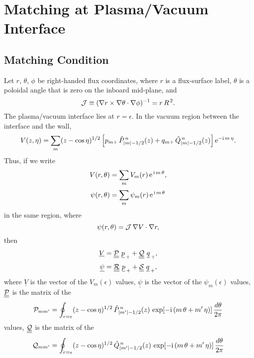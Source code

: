 \documentclass[12pt,prb,aps,notitlepage]{revtex4-1}
\begin{document}
\section{Matching at Plasma/Vacuum Interface}
\subsection{Matching Condition}
Let $r$, $\theta$, $\phi$ be right-handed flux coordinates, where $r$ is a flux-surface label,  $\theta$ is a poloidal angle that is zero on the inboard mid-plane, and
\begin{equation}
{\cal J} \equiv (\nabla r\times\nabla\theta\cdot\nabla\phi)^{-1}= r\,R^{\,2}.
\end{equation}
The plasma/vacuum interface lies at $r=\epsilon$. In the vacuum region between the interface and the wall, 
\begin{equation}
V(z,\eta) =\sum_m (z-\cos\eta)^{1/2}\left[p_{m+}\,\hat{P}_{|m|-1/2}^{\,n}(z)+q_{m+}\,\hat{Q}_{|m|-1/2}^{\,n}(z)\right]{\rm e}^{-{\rm i}\,m\,\eta}. 
\end{equation}
Thus, if we write 
\begin{align}\label{e90}
V(r,\theta) &= \sum_m V_m(r)\,{\rm e}^{\,{\rm i}\,m\,\theta},\\[0.5ex]
\psi(r,\theta) & = \sum_m \psi_m(r)\,{\rm e}^{\,{\rm i}\,m\,\theta}\label{e91}
\end{align}
in the same region,
where
\begin{equation}
\psi(r,\theta)  = {\cal J}\,\nabla V\cdot\nabla r,
\end{equation}
then
\begin{align}
\underline{V}&= \underline{\underline{{\cal P}}}\,\,\underline{p}_{\,+}+ \underline{\underline{{\cal Q}}}\,\,\underline{q}_{\,+},\\[0.5ex]
\underline{\psi}&= \underline{\underline{{\cal R}}}\,\,\underline{p}_{\,+}+ \underline{\underline{{\cal S}}}\,\,\underline{q}_{\,+},
\end{align}
where $\underline{V}$ is the vector of the $V_m(\epsilon)$ values, $\underline{\psi}$ is the vector of the $\psi_m(\epsilon)$ values, $\underline{\underline{{\cal P}}}$ is the
matrix of the
\begin{equation}
{\cal P}_{mm'}=\oint_{r=\epsilon}(z-\cos\eta)^{1/2}\,\hat{P}_{|m'|-1/2}^{\,n}(z)\,\exp[-{\rm i}\,(m\,\theta+m'\,\eta)]\,\frac{d\theta}{2\pi}
\end{equation}
values, 
$\underline{\underline{{\cal Q}}}$ is the
matrix of the
\begin{equation}
{\cal Q}_{mm'}=\oint_{r=\epsilon}(z-\cos\eta)^{1/2}\,\hat{Q}_{|m'|-1/2}^{\,n}(z)\,\exp[-{\rm i}\,(m\,\theta+m'\,\eta)]\,\frac{d\theta}{2\pi}
\end{equation}
\end{document}
